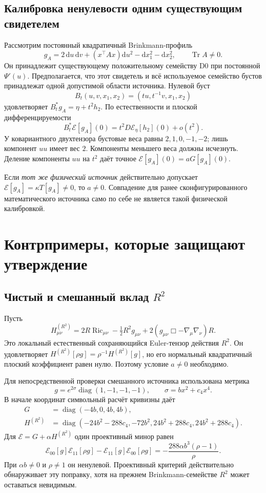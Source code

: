 \documentclass[11pt,a4paper]{article}
\newcommand{\E}{\mathcal E}
\newcommand{\dd}{\mathrm d}
\DeclareMathOperator{\Ric}{Ric}
\DeclareMathOperator{\Tr}{Tr}
\begin{document}
\subsection{Калибровка ненулевости одним существующим свидетелем}
Рассмотрим постоянный квадратичный Brinkmann-профиль
\[
g_A=2\,\dd u\,\dd v+(x^\top Ax)\dd u^2-\dd x_1^2-\dd x_2^2,
\qquad \Tr A\ne0.
\]
Он принадлежит существующему положительному семейству D0 при постоянной $\Psi'(u)$. Предполагается, что этот свидетель и всё используемое семейство бустов принадлежат одной допустимой области источника. Нулевой буст
\[
B_t(u,v,x_1,x_2)=(tu,t^{-1}v,x_1,x_2)
\]
удовлетворяет $B_t^*g_A=\eta+t^2h_2$. По естественности и плоской дифференцируемости
\[
B_t^*\E[g_A](0)=t^2D\E_\eta[h_2](0)+o(t^2).
\]
У ковариантного двухтензора бустовые веса равны $2,1,0,-1,-2$; лишь компонент $uu$ имеет вес $2$. Компоненты меньшего веса должны исчезнуть. Деление компоненты $uu$ на $t^2$ даёт точное $\E[g_A](0)=aG[g_A](0)$.

Если \emph{тот же физический источник} действительно допускает
$\E[g_A]=\kappa T[g_A]\ne0$, то $a\ne0$. Совпадение для ранее сконфигурированного математического источника само по себе не является такой физической калибровкой.

\section{Контрпримеры, которые защищают утверждение}
\subsection{Чистый и смешанный вклад $R^2$}
Пусть
\[
H^{(R^2)}_{\mu\nu}=
2R\Ric_{\mu\nu}-\tfrac12R^2g_{\mu\nu}
+2(g_{\mu\nu}\Box-\nabla_\mu\nabla_\nu)R.
\]
Это локальный естественный сохраняющийся Euler-тензор действия $R^2$. Он удовлетворяет
$H^{(R^2)}[\rho g]=\rho^{-1}H^{(R^2)}[g]$, но его нормальный квадратичный плоский коэффициент равен нулю. Поэтому условие $a\ne0$ необходимо.

Для непосредственной проверки смешанного источника использована метрика
\[
g=e^{2\sigma}\operatorname{diag}(1,-1,-1,-1),\qquad
\sigma=b x^2+c_4x^4.
\]
В начале координат символьный расчёт кривизны даёт
\begin{align*}
G&=\operatorname{diag}(-4b,0,4b,4b),\\
H^{(R^2)}&=\operatorname{diag}(-24b^2-288c_4,-72b^2,
24b^2+288c_4,24b^2+288c_4).
\end{align*}
Для $\E=G+\alpha H^{(R^2)}$ один проективный минор равен
\[
\E_{00}[g]\E_{11}[\rho g]-\E_{11}[g]\E_{00}[\rho g]
=-\frac{288\alpha b^3(\rho-1)}{\rho}.
\]
При $\alpha b\ne0$ и $\rho\ne1$ он ненулевой. Проективный критерий действительно обнаруживает эту поправку, хотя на прежнем Brinkmann-семействе $R^2$ может оставаться невидимым.
\end{document}

